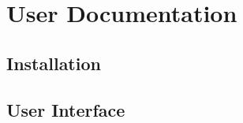 \section{User Documentation}
\label{sec:userdocs}

\subsection{Installation}

\subsection{User Interface}
